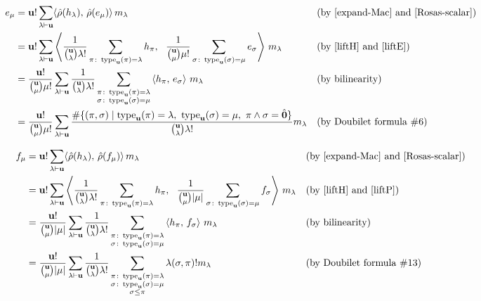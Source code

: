 \begin{align*}
e_\mu &=  \uu! \sum_{\lambda\partn\uu} \langle \hat\rho(h_\lambda),\,\hat\rho(e_\mu)\rangle\, m_\lambda
	&&\text{(by~\eqref{expand-Mac} and~\eqref{Rosas-scalar})}\\
&=  \uu! \sum_{\lambda\partn\uu} \left\langle \frac{1}{\binom{\uu}{\lambda}\lambda!} \sum_{\pi\colon \type_\uu(\pi)=\lambda} h_\pi, \ \ \frac{1}{\binom{\uu}{\mu}\mu!} \sum_{\sigma\colon \type_\uu(\sigma)=\mu} e_\sigma \right\rangle\, m_\lambda
	&&\text{(by~\eqref{liftH} and~\eqref{liftE})}\\
&=  \frac{\uu!}{\binom{\uu}{\mu}\mu!} \sum_{\lambda\partn\uu} \frac{1}{\binom{\uu}{\lambda}\lambda!}
    \sum_{\substack{\pi\colon \type_\uu(\pi)=\lambda\\ \sigma\colon \type_\uu(\sigma)=\mu}}
    \left\langle h_\pi,\,e_\sigma \right\rangle\, m_\lambda
	&&\text{(by bilinearity)}\\
&=  \frac{\uu!}{\binom{\uu}{\mu}\mu!} \sum_{\lambda\partn\uu} \frac{\#\{(\pi,\sigma)\mid \type_\uu(\pi)=\lambda,\ \type_\uu(\sigma)=\mu,\ \pi\meet\sigma=\hatzero\}}{\binom{\uu}{\lambda}\lambda!} m_\lambda
	&&\text{(by Doubilet formula \#6)}\\
\end{align*}

\begin{align*}
f_\mu &=  \mathbf{u}! \sum_{\lambda\vdash\mathbf{u}} \langle \hat\rho(h_\lambda),\,\hat\rho(f_\mu)\rangle\, m_\lambda
	&&\text{(by~\eqref{expand-Mac} and~\eqref{Rosas-scalar})}\\
&=  \mathbf{u}! \sum_{\lambda\vdash\mathbf{u}} \left\langle \frac{1}{\binom{\mathbf{u}}{\lambda}\lambda!} \sum_{\pi\colon \operatorname{type}_{\mathbf{u}}(\pi)=\lambda} h_\pi, \ \ \frac{1}{\binom{\mathbf{u}}{\mu}|\mu|} \sum_{\sigma\colon \operatorname{type}_{\mathbf{u}}(\sigma)=\mu} f_\sigma \right\rangle\, m_\lambda
	&&\text{(by~\eqref{liftH} and~\eqref{liftP})}\\
&=  \frac{\mathbf{u}!}{\binom{\mathbf{u}}{\mu}|\mu|} \sum_{\lambda\vdash\mathbf{u}} \frac{1}{\binom{\mathbf{u}}{\lambda}\lambda!}
    \sum_{\substack{\pi\colon \operatorname{type}_{\mathbf{u}}(\pi)=\lambda\\ \sigma\colon \operatorname{type}_{\mathbf{u}}(\sigma)=\mu}}
    \left\langle h_\pi,\,f_\sigma \right\rangle\, m_\lambda
	&&\text{(by bilinearity)}\\
&=  \frac{\mathbf{u}!}{\binom{\mathbf{u}}{\mu}|\mu|} \sum_{\lambda\vdash\mathbf{u}} \frac{1}{\binom{\mathbf{u}}{\lambda}\lambda!}
    \sum_{\substack{\pi\colon \operatorname{type}_{\mathbf{u}}(\pi)=\lambda\\ \sigma\colon \operatorname{type}_{\mathbf{u}}(\sigma)=\mu\\ \sigma\leq\pi}}
    \lambda(\sigma,\pi)!  m_\lambda
	&&\text{(by Doubilet formula \#13)}\\
\end{align*}

